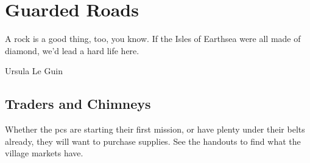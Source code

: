 \chapter{Guarded Roads}
\epigraph{A rock is a good thing, too, you know. If the Isles of Earthsea were all made of diamond, we'd lead a hard life here.}{Ursula Le Guin}

\section{Traders and Chimneys}


Whether the \glspl{pc} are starting their first mission, or have plenty under their belts already, they will want to purchase supplies.
See the handouts to find what the \gls{village} markets have.
